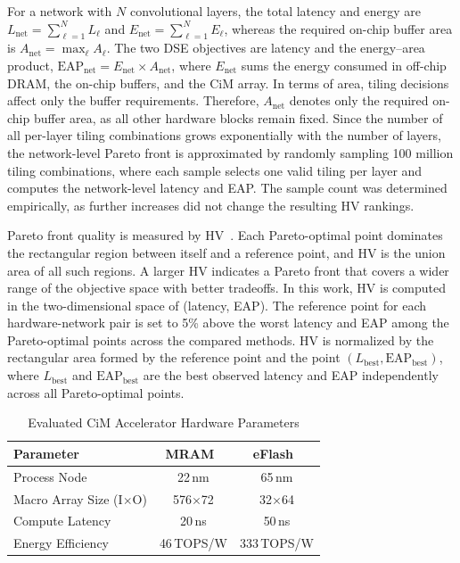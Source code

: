 \documentclass[lettersize,journal]{IEEEtran}
\begin{document}
For a network with $N$ convolutional layers, the total latency and energy are $L_{\mathrm{net}} = \sum_{\ell=1}^{N} L_{\ell}$ and $E_{\mathrm{net}} = \sum_{\ell=1}^{N} E_{\ell}$, whereas the required on-chip buffer area is $A_{\mathrm{net}} = \max_{\ell} A_{\ell}$.
The two DSE objectives are latency and the energy--area product, $\mathrm{EAP}_{\mathrm{net}} = E_{\mathrm{net}} \times A_{\mathrm{net}}$, where $E_{\mathrm{net}}$ sums the energy consumed in off-chip DRAM, the on-chip buffers, and the CiM array.
In terms of area, tiling decisions affect only the buffer requirements.
Therefore, $A_{\mathrm{net}}$ denotes only the required on-chip buffer area, as all other hardware blocks remain fixed.
Since the number of all per-layer tiling combinations grows exponentially with the number of layers, the network-level Pareto front is approximated by randomly sampling 100 million tiling combinations, where each sample selects one valid tiling per layer and computes the network-level latency and EAP.
The sample count was determined empirically, as further increases did not change the resulting HV rankings.

Pareto front quality is measured by HV~\cite{xu2025rankdse}.
Each Pareto-optimal point dominates the rectangular region between itself and a reference point, and HV is the union area of all such regions.
A larger HV indicates a Pareto front that covers a wider range of the objective space with better tradeoffs.
In this work, HV is computed in the two-dimensional space of (latency, EAP).
The reference point for each hardware-network pair is set to 5\% above the worst latency and EAP among the Pareto-optimal points across the compared methods.
HV is normalized by the rectangular area formed by the reference point and the point $(L_{\mathrm{best}}, \mathrm{EAP}_{\mathrm{best}})$, where $L_{\mathrm{best}}$ and $\mathrm{EAP}_{\mathrm{best}}$ are the best observed latency and EAP independently across all Pareto-optimal points.

\begin{table}[!t]
\caption{Evaluated CiM Accelerator Hardware Parameters}
\label{tab:hardware_config}
\centering
\small
\begin{tabular}{lcc}
\toprule
\textbf{Parameter} & \textbf{MRAM}~\cite{chiu2023isscc_mram} & \textbf{eFlash}~\cite{choi2023cicc_eflash} \\
\midrule
Process Node & 22\,nm & 65\,nm \\
Macro Array Size (I$\times$O) & 576$\times$72 & 32$\times$64 \\
Compute Latency & 20\,ns & 50\,ns \\
Energy Efficiency & 46\,TOPS/W & 333\,TOPS/W \\
\bottomrule
\end{tabular}
\end{table}
\end{document}
